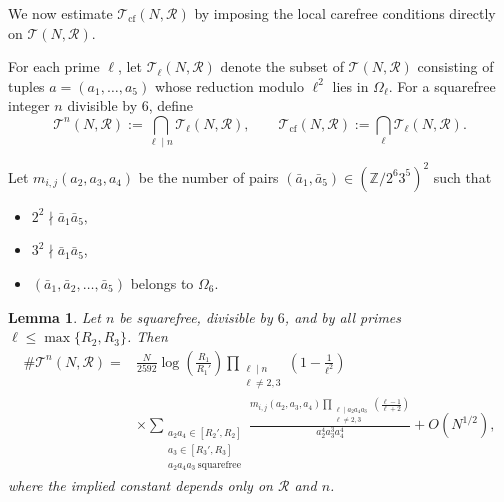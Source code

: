 \documentclass[table]{amsart}
\newtheorem{lemma}[theorem]{Lemma}
\newcommand{\Z}{\mathbb{Z}}
\newcommand{\op}[1]{\operatorname{#1}}
\numberwithin{equation}{section}
\begin{document}
We now estimate $\mathcal{T}_{\op{cf}}(N,\mathscr{R})$ by imposing the local
carefree conditions directly on $\mathcal{T}(N,\mathscr{R})$.

For each prime $\ell$, let $\mathcal{T}_\ell(N,\mathscr{R})$ denote the subset
of $\mathcal{T}(N,\mathscr{R})$ consisting of tuples
$a=(a_1,\dots,a_5)$ whose reduction modulo $\ell^2$ lies in $\Omega_\ell$.
For a squarefree integer $n$ divisible by $6$, define
\[
\mathcal{T}^n(N,\mathscr{R})
:=
\bigcap_{\ell\mid n}\mathcal{T}_\ell(N,\mathscr{R}),
\qquad
\mathcal{T}_{\op{cf}}(N,\mathscr{R})
:=
\bigcap_\ell \mathcal{T}_\ell(N,\mathscr{R}).
\]

Let $m_{i,j}(a_2,a_3, a_4)$ be the number of pairs $(\bar{a}_1,\bar{a}_5)\in (\Z/2^{6}3^{5})^2$ such that
\begin{itemize}
    \item $2^2\nmid \bar{a}_1\bar{a}_5,$
    \item $3^2\nmid \bar{a}_1\bar{a}_5$,
    \item $(\bar{a}_1, \bar{a}_2, \dots, \bar{a}_5)$ belongs to $\Omega_6$.
\end{itemize}

\begin{lemma}\label{Tn-asymp}
Let $n$ be squarefree, divisible by $6$, and by all primes $\ell\le \op{max}\{R_2,R_3\}$.
Then
\[
\begin{split}
\#\mathcal{T}^n(N,\mathscr{R})
=&
\frac{N}{2592}
\log\!\left(\frac{R_1}{R_1'}\right)
\prod_{\substack{\ell\mid n\\ \ell\neq 2,3}}
\left(1-\frac{1}{\ell^2}\right) \\
&\times
\sum_{\substack{a_2a_4\in[R_2',R_2]\\
a_3\in[R_3',R_3]\\
a_2a_4a_3\ \mathrm{squarefree}}}
\frac{m_{i,j}(a_2,a_3,a_4)
\prod_{\substack{\ell\mid a_2a_4a_3\\ \ell\neq 2,3}}
\left(\frac{\ell-1}{\ell+2}\right)}
{a_2^4 a_3^3 a_4^4}
+O\!\left(N^{1/2}\right),
\end{split}
\]
where the implied constant depends only on $\mathscr{R}$ and $n$.
\end{lemma}
\end{document}
